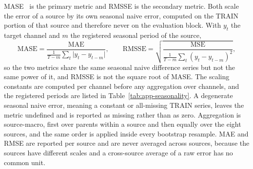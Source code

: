 \documentclass{article}
\begin{document}
MASE~\citep{hyndman2006mase} is the primary metric and RMSSE is the secondary metric. Both
scale the error of a source by its own seasonal naive error, computed on the TRAIN portion of
that source and therefore never on the evaluation block. With $y_t$ the target channel and $m$
the registered seasonal period of the source,
\begin{equation}
  \mathrm{MASE} = \frac{\mathrm{MAE}}{\frac{1}{T-m}\sum_{t} \lvert y_t - y_{t-m} \rvert},
  \qquad
  \mathrm{RMSSE} = \sqrt{\frac{\mathrm{MSE}}{\frac{1}{T-m}\sum_{t} (y_t - y_{t-m})^2}},
  \label{eq:metrics}
\end{equation}
so the two metrics share the same seasonal naive difference series but not the same power of
it, and RMSSE is not the square root of MASE. The scaling constants are computed per channel
before any aggregation over channels, and the registered periods are listed in
Table~\ref{tab:app-seasonality}. A degenerate seasonal naive error, meaning a constant or
all-missing TRAIN series, leaves the metric undefined and is reported as missing rather than
as zero. Aggregation is source-macro, first over parents within a source and then equally over
the eight sources, and the same order is applied inside every bootstrap resample. MAE and RMSE
are reported per source and are never averaged across sources, because the sources have
different scales and a cross-source average of a raw error has no common unit.

\begin{table}[h]
  \caption{Per-source seasonal periods and context conventions used by the metric
  denominators. Context length is $L = 512$ for every source. The seasonal period is the
  sampling-frequency period registered before any run, not a tuned quantity.}
  \label{tab:app-seasonality}
  \centering
  \small
  \setlength{\tabcolsep}{4pt}
\end{table}
\end{document}
